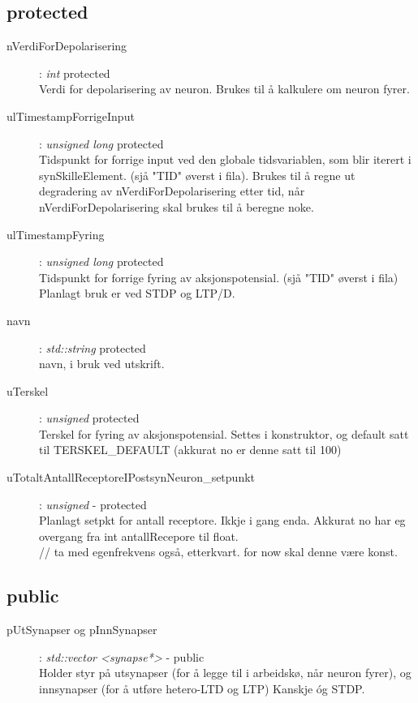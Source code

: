 		\subsection{protected}
			\begin{description}
				\item[nVerdiForDepolarisering] : \textit{int} 		  \hspace{3cm} protected \\
				Verdi for depolarisering av neuron. Brukes til å kalkulere om neuron fyrer. 
				\item[ulTimestampForrigeInput] : \textit{unsigned long} \hspace{5cm}	protected \\
				Tidspunkt for forrige input ved den globale tidsvariablen, som blir iterert i synSkilleElement. (sjå "TID" øverst i fila).
				Brukes til å regne ut degradering av nVerdiForDepolarisering etter tid, når nVerdiForDepolarisering skal brukes til å beregne noke.
				\item[ulTimestampFyring]  	 : \textit{unsigned long} \hspace{5cm}	protected \\
				Tidspunkt for forrige fyring av aksjonspotensial. (sjå "TID" øverst i fila)\\
				Planlagt bruk er ved STDP og LTP/D.
				
				\item[navn] 			 : \textit{std::string} \hspace{4cm}	protected\\
				navn, i bruk ved utskrift.
			
				\item[uTerskel] 		  	:  \textit{unsigned}  	\hspace{3cm}	protected\\
				Terskel for fyring av aksjonspotensial. Settes i konstruktor, og default satt til TERSKEL\_DEFAULT (akkurat no er denne satt til 100)
				
				\item[uTotaltAntallReceptoreIPostsynNeuron\_setpunkt] : \textit{unsigned} \indent - protected \\
				Planlagt setpkt for antall receptore. Ikkje i gang enda. Akkurat no har eg overgang fra int antallRecepore til float.\\
				// ta med egenfrekvens også, etterkvart. for now skal denne være konst.
 			\end{description}
		\subsection{public}
			\begin{description}
				\item[pUtSynapser og pInnSynapser] : \textit{std::vector <synapse*>} \indent - public \\
				Holder styr på utsynapser (for å legge til i arbeidskø, når neuron fyrer), og innsynapser (for å utføre hetero-LTD og LTP) 
				Kanskje \'{o}g STDP.
	\end{description}

